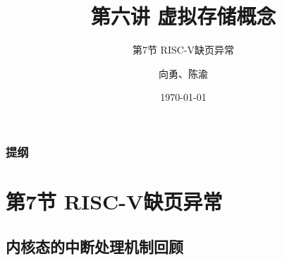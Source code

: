 


\title[第6讲]{第六讲 虚拟存储概念} %
\subtitle{第7节 RISC-V缺页异常}
\author{向勇、陈渝} %
\date{\today} %



\begin{frame}
\titlepage %
\end{frame}

\begin{frame}
\frametitle{提纲} %
\tableofcontents %
\end{frame}
\section{第7节 RISC-V缺页异常}%
\subsection{内核态的中断处理机制回顾} %



